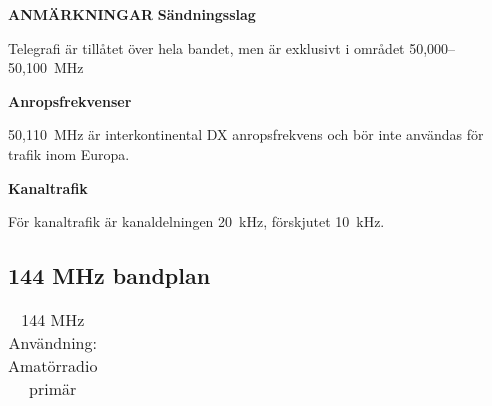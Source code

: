 \textbf{ANMÄRKNINGAR}
\textbf{Sändningsslag}

Telegrafi är tillåtet över hela bandet, men är exklusivt i området
50,000--50,100~MHz

\textbf{Anropsfrekvenser}

50,110~MHz är interkontinental DX anropsfrekvens och bör inte användas
för trafik inom Europa.

\textbf{Kanaltrafik}

För kanaltrafik är kanaldelningen 20~kHz, förskjutet 10~kHz.

\subsection{144 MHz bandplan}

\setlongtables
\begin{longtable}{llll}
\caption{144 MHz Användning: Amatörradio primär} \\


\end{longtable}
